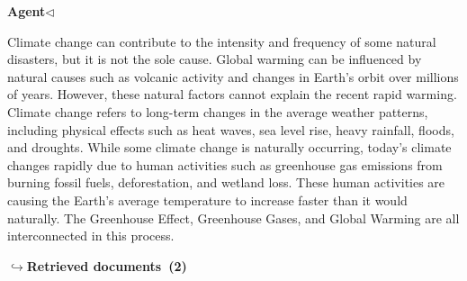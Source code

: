 \documentclass[a4paper,11pt]{article}
\begin{document}
\noindent\hfill{\small\textcolor{agentcolor}{\textbf{Agent\enspace$\triangleleft$}}}
\begin{agentbubble}
Climate change can contribute to the intensity and frequency of some natural disasters, but it is not the sole cause. Global warming can be influenced by natural causes such as volcanic activity and changes in Earth's orbit over millions of years. However, these natural factors cannot explain the recent rapid warming. Climate change refers to long-term changes in the average weather patterns, including physical effects such as heat waves, sea level rise, heavy rainfall, floods, and droughts. While some climate change is naturally occurring, today's climate changes rapidly due to human activities such as greenhouse gas emissions from burning fossil fuels, deforestation, and wetland loss. These human activities are causing the Earth's average temperature to increase faster than it would naturally. The Greenhouse Effect, Greenhouse Gases, and Global Warming are all interconnected in this process.
\end{agentbubble}
\noindent\hfill{\footnotesize\textcolor{doccolor}{\textbf{$\hookrightarrow$\enspace Retrieved documents~(2)}}}
\end{document}

